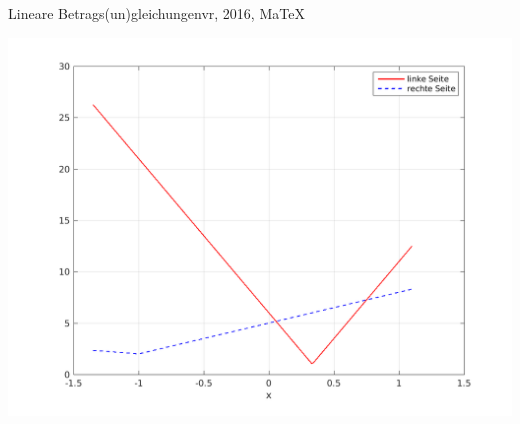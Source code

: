 \begin{MAufgabe}{Lineare Betrags(un)gleichungen}{vr, 2016, MaTeX}
 \begin{center}
 \includegraphics[width=0.8\linewidth]{Abb_zur_Ag_autogenerated_ineq_7.png} \end{center}
 
\else\relax\fi
 \end{MAufgabe}